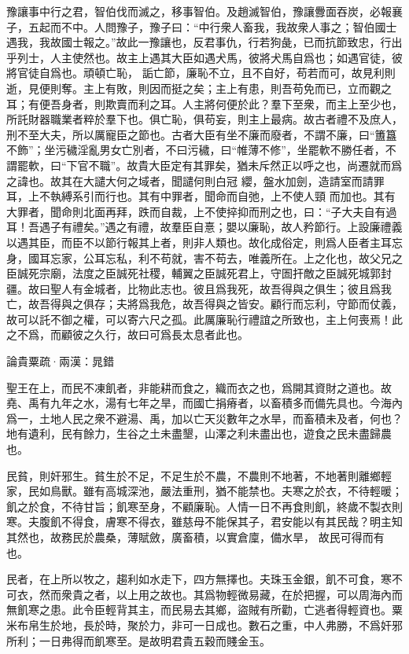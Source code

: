 \documentclass[12pt,a4paper]{ctexbook}
\begin{document}
豫讓事中行之君，智伯伐而滅之，移事智伯。及趙滅智伯，豫讓釁面吞炭，必報襄子，五起而不中。人問豫子，豫子曰：“中行衆人畜我，我故衆人事之；智伯國士遇我，我故國士報之。”故此一豫讓也，反君事仇，行若狗彘，已而抗節致忠，行出乎列士，人主使然也。故主上遇其大臣如遇犬馬，彼將犬馬自爲也；如遇官徒，彼將官徒自爲也。頑頓亡恥， 詬亡節，廉恥不立，且不自好，苟若而可，故見利則逝，見便則奪。主上有敗，則因而挺之矣；主上有患，則吾苟免而已，立而觀之耳；有便吾身者，則欺賣而利之耳。人主將何便於此？羣下至衆，而主上至少也，所託財器職業者粹於羣下也。俱亡恥，俱苟妄，則主上最病。故古者禮不及庶人，刑不至大夫，所以厲寵臣之節也。古者大臣有坐不廉而廢者，不謂不廉，曰“簠簋不飾”；坐污穢淫亂男女亡別者，不曰污穢，曰“帷薄不修”，坐罷軟不勝任者，不謂罷軟，曰“下官不職”。故貴大臣定有其罪矣，猶未斥然正以呼之也，尚遷就而爲之諱也。故其在大譴大何之域者，聞譴何則白冠 纓，盤水加劍，造請室而請罪耳，上不執縛系引而行也。其有中罪者，聞命而自弛，上不使人頸 而加也。其有大罪者，聞命則北面再拜，跌而自裁，上不使捽抑而刑之也，曰：“子大夫自有過耳！吾遇子有禮矣。”遇之有禮，故羣臣自憙；嬰以廉恥，故人矜節行。上設廉禮義以遇其臣，而臣不以節行報其上者，則非人類也。故化成俗定，則爲人臣者主耳忘身，國耳忘家，公耳忘私，利不苟就，害不苟去，唯義所在。上之化也，故父兄之臣誠死宗廟，法度之臣誠死社稷，輔翼之臣誠死君上，守圄扞敵之臣誠死城郭封疆。故曰聖人有金城者，比物此志也。彼且爲我死，故吾得與之俱生；彼且爲我亡，故吾得與之俱存；夫將爲我危，故吾得與之皆安。顧行而忘利，守節而仗義，故可以託不御之權，可以寄六尺之孤。此厲廉恥行禮誼之所致也，主上何喪焉！此之不爲，而顧彼之久行，故曰可爲長太息者此也。\par
論貴粟疏·兩漢：晁錯 \par
聖王在上，而民不凍飢者，非能耕而食之，織而衣之也，爲開其資財之道也。故堯、禹有九年之水，湯有七年之旱，而國亡捐瘠者，以畜積多而備先具也。今海內爲一，土地人民之衆不避湯、禹，加以亡天災數年之水旱，而畜積未及者，何也？地有遺利，民有餘力，生谷之土未盡墾，山澤之利未盡出也，遊食之民未盡歸農也。\par
民貧，則奸邪生。貧生於不足，不足生於不農，不農則不地著，不地著則離鄉輕家，民如鳥獸。雖有高城深池，嚴法重刑，猶不能禁也。夫寒之於衣，不待輕暖；飢之於食，不待甘旨；飢寒至身，不顧廉恥。人情一日不再食則飢，終歲不製衣則寒。夫腹飢不得食，膚寒不得衣，雖慈母不能保其子，君安能以有其民哉？明主知其然也，故務民於農桑，薄賦斂，廣畜積，以實倉廩，備水旱， 故民可得而有也。\par
民者，在上所以牧之，趨利如水走下，四方無擇也。夫珠玉金銀，飢不可食，寒不可衣，然而衆貴之者，以上用之故也。其爲物輕微易藏，在於把握，可以周海內而無飢寒之患。此令臣輕背其主，而民易去其鄉，盜賊有所勸，亡逃者得輕資也。粟米布帛生於地，長於時，聚於力，非可一日成也。數石之重，中人弗勝，不爲奸邪所利；一日弗得而飢寒至。是故明君貴五穀而賤金玉。\par
\end{document}
